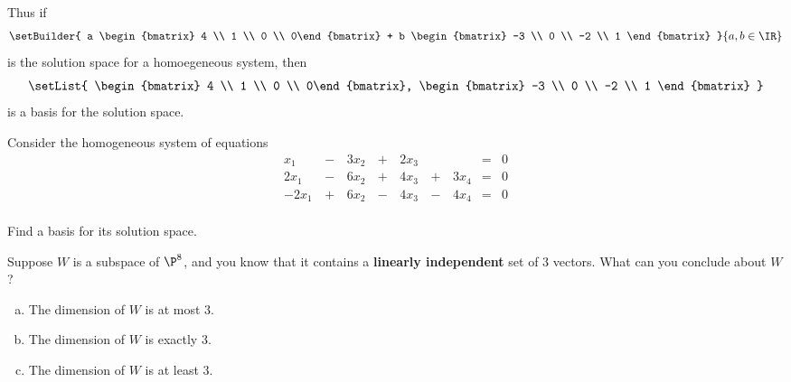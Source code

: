 \begin{applicationActivities}
\begin{fact}
  Thus if
  \[
    \setBuilder{
      a \begin{bmatrix} 4 \\ 1 \\ 0 \\ 0\end{bmatrix} +
      b \begin{bmatrix} -3 \\ 0 \\ -2 \\ 1 \end{bmatrix}
    }{
      a,b \in \IR
    }
  \]
  is the solution space for a homoegeneous system, then
  \[
    \setList{
      \begin{bmatrix} 4 \\ 1 \\ 0 \\ 0\end{bmatrix},
      \begin{bmatrix} -3 \\ 0 \\ -2 \\ 1 \end{bmatrix}
    }
  \]
  is a basis for the solution space.
\end{fact}

\begin{activity}{10}
Consider the homogeneous system of equations
\begin{alignat*}{5}
x_1&\,-\,&3x_2&\,+\,& 2x_3&\,\,&  &=& 0 \\
2x_1&\,-\,&6x_2&\,+\,&4x_3 &\,+\,&3 x_4 &=& 0 \\
-2x_1&\,+\,&6x_2&\,-\,&4x_3 &\,-\,&4 x_4 &=& 0 \\
\end{alignat*}

Find a basis for its solution space.
\end{activity}

\begin{activity}{5}
Suppose \(W\) is a subspace of \(\P^8\), and you know that
it contains a \textbf{linearly independent} set of \(3\) vectors.
What can you conclude about \(W\)?
\begin{enumerate}[(a)]
\item The dimension of \(W\) is at most 3.
\item The dimension of \(W\) is exactly 3.
\item The dimension of \(W\) is at least 3.
\end{enumerate}
\end{activity}


\end{applicationActivities}
